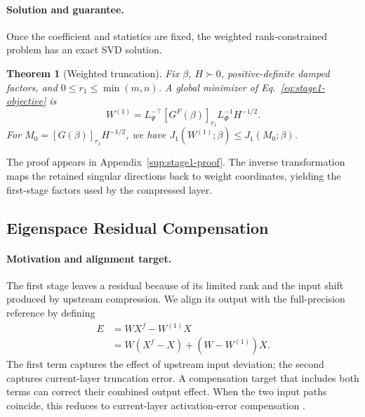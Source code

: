 \documentclass[11pt]{article}
\newtheorem{theorem}{Theorem}
\begin{document}
\paragraph{Solution and guarantee.}
Once the coefficient and statistics are fixed, the weighted rank-constrained problem has an exact SVD solution.
\begin{theorem}[Weighted truncation]\label{thm:fisher}
Fix $\beta$, $H\succ0$, positive-definite damped factors, and $0\le r_1\le\min(m,n)$. A global minimizer of Eq.~\eqref{eq:stage1-objective} is
\begin{equation}
W^{(1)}=L_\Psi^{-\top}[G^F(\beta)]_{r_1}
L_\Phi^{-1}H^{-1/2}.
\label{eq:stage1-output}
\end{equation}
For $M_0=[G(\beta)]_{r_1}H^{-1/2}$, we have $J_1(W^{(1)};\beta)\le J_1(M_0;\beta)$.
\end{theorem}
The proof appears in Appendix~\ref{sup:stage1-proof}. The inverse transformation maps the retained singular directions back to weight coordinates, yielding the first-stage factors used by the compressed layer.

\subsection{Eigenspace Residual Compensation}\label{sec:eigenspace-comp}

\paragraph{Motivation and alignment target.}
The first stage leaves a residual because of its limited rank and the input shift produced by upstream compression. We align its output with the full-precision reference by defining
\begin{equation}
\begin{aligned}
E&=WX^f-W^{(1)}X\\
 &=W(X^f-X)+(W-W^{(1)})X.
\end{aligned}
\label{eq:global-alignment-error}
\end{equation}
The first term captures the effect of upstream input deviation; the second captures current-layer truncation error. A compensation target that includes both terms can correct their combined output effect. When the two input paths coincide, this reduces to current-layer activation-error compensation \citep{liu2025eora}.
\end{document}
